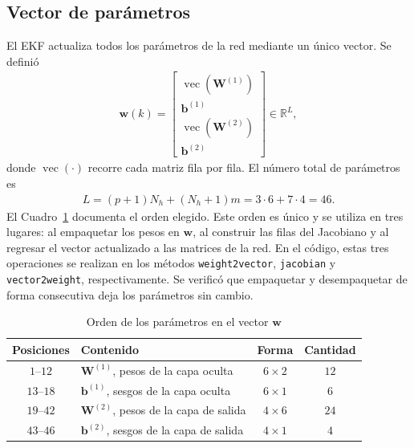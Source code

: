 \documentclass[conference]{IEEEtran}
\begin{document}
\subsection{Vector de parámetros}
El EKF actualiza todos los parámetros de la red mediante un único vector.
Se definió
\begin{align}
    \label{eq:w}
    \mathbf{w}(k)=
    \begin{bmatrix}
    \operatorname{vec}\!\left(\mathbf{W}^{(1)}\right)\\[2pt]
    \mathbf{b}^{(1)}\\[2pt]
    \operatorname{vec}\!\left(\mathbf{W}^{(2)}\right)\\[2pt]
    \mathbf{b}^{(2)}
    \end{bmatrix}\in\mathbb{R}^{L},
\end{align}
donde $\operatorname{vec}(\cdot)$ recorre cada matriz fila por fila. El
número total de parámetros es
\begin{align}
    \label{eq:L}
    L=(p+1)N_h+(N_h+1)m=3\cdot6+7\cdot4=46.
\end{align}
El Cuadro~\ref{tab:orden} documenta el orden elegido. Este orden es único y
se utiliza en tres lugares: al empaquetar los pesos en $\mathbf{w}$, al
construir las filas del Jacobiano y al regresar el vector actualizado a las
matrices de la red. En el código, estas tres operaciones se realizan en
los métodos \texttt{weight2vector}, \texttt{jacobian} y
\texttt{vector2weight}, respectivamente.
Se verificó que empaquetar y desempaquetar de forma consecutiva deja los
parámetros sin cambio.

\begin{table}[htbp]
\caption{Orden de los parámetros en el vector $\mathbf{w}$}
\label{tab:orden}
\begin{center}
\begin{tabular}{clcc}
\toprule
\textbf{Posiciones} & \textbf{Contenido} & \textbf{Forma} & \textbf{Cantidad} \\
\midrule
$1$--$12$  & $\mathbf{W}^{(1)}$, pesos de la capa oculta   & $6\times2$ & $12$ \\
$13$--$18$ & $\mathbf{b}^{(1)}$, sesgos de la capa oculta  & $6\times1$ & $6$ \\
$19$--$42$ & $\mathbf{W}^{(2)}$, pesos de la capa de salida  & $4\times6$ & $24$ \\
$43$--$46$ & $\mathbf{b}^{(2)}$, sesgos de la capa de salida & $4\times1$ & $4$ \\
\bottomrule
\end{tabular}
\end{center}
\end{table}
\end{document}
